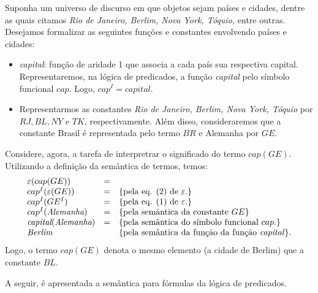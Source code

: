 \begin{Example}
Suponha um universo de discurso em que objetos sejam países e cidades,
dentre as quais citamos \textit{Rio de Janeiro, Berlim, Nova York,
  Tóquio,} entre outras. Desejamos formalizar as seguintes funções e
constantes envolvendo países e cidades:
\begin{itemize}
   \item \textit{capital}: função de aridade 1 que associa a cada país
     sua respectiva capital. Representaremos, na lógica de predicados,
     a  função \textit{capital} pelo símbolo funcional $cap$. Logo,
     $cap^I = \textit{capital}$.
   \item Representarmos as constantes \textit{Rio de Janeiro, Berlim, Nova York,
  Tóquio} por $RJ, BL, NY$ e $TK$, respectivamente. Além disso,
   consideraremos que a constante Brasil é representada pelo termo
   $BR$ e Alemanha por $GE$.
\end{itemize}
Considere, agora, a tarefa de interpretrar o significado do termo
$cap(GE)$. Utilizando a definição da semântica de termos, temos:
\[
\begin{array}{lcl}
\varepsilon(cap(GE)) & = &\\
cap^I(\varepsilon(GE)) & = & \{\text{pela eq. (2) de }\varepsilon.\}\\
cap^I(GE^I) & = & \{\text{pela eq. (1) de }\varepsilon.\}\\
cap^I(\textit{Alemanha}) & = & \{\text{pela semântica da constante }GE\}\\
\textit{capital}(\textit{Alemanha}) & = & \{\text{pela semântica do
  símbolo funcional }cap.\}\\
\textit{Berlim} & & \{\text{pela semântica da função da função \textit{capital}}\}.
\end{array}
\]
Logo, o termo $cap(GE)$ denota o mesmo elemento (a cidade de Berlim)
que a constante $BL$.
\end{Example}
A seguir, é apresentada a semântica para fórmulas da lógica de
predicados.
